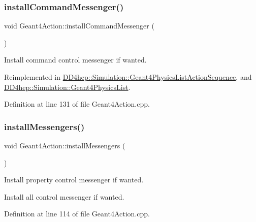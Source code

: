 \subsubsection{\texorpdfstring{install\+Command\+Messenger()}{installCommandMessenger()}}
{\footnotesize\ttfamily void Geant4\+Action\+::install\+Command\+Messenger (\begin{DoxyParamCaption}{ }\end{DoxyParamCaption})\hspace{0.3cm}{\ttfamily [virtual]}}



Install command control messenger if wanted. 



Reimplemented in \hyperlink{class_d_d4hep_1_1_simulation_1_1_geant4_physics_list_action_sequence_a9c60c66de8a46726b0b3d781042c22a6}{D\+D4hep\+::\+Simulation\+::\+Geant4\+Physics\+List\+Action\+Sequence}, and \hyperlink{class_d_d4hep_1_1_simulation_1_1_geant4_physics_list_af18b7d6454f56d0aa6e55a2046cff019}{D\+D4hep\+::\+Simulation\+::\+Geant4\+Physics\+List}.



Definition at line 131 of file Geant4\+Action.\+cpp.

\hypertarget{class_d_d4hep_1_1_simulation_1_1_geant4_action_a82c72e9476d6a5541252edbb93fe69c6}{}\label{class_d_d4hep_1_1_simulation_1_1_geant4_action_a82c72e9476d6a5541252edbb93fe69c6} 
\subsubsection{\texorpdfstring{install\+Messengers()}{installMessengers()}}
{\footnotesize\ttfamily void Geant4\+Action\+::install\+Messengers (\begin{DoxyParamCaption}{ }\end{DoxyParamCaption})\hspace{0.3cm}{\ttfamily [virtual]}}



Install property control messenger if wanted. 

Install all control messenger if wanted. 

Definition at line 114 of file Geant4\+Action.\+cpp.

